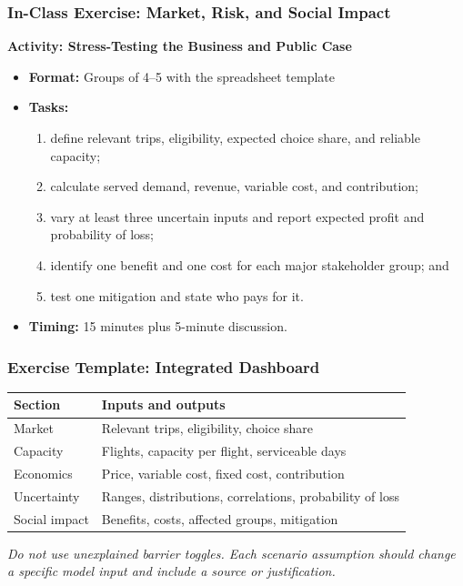 \documentclass{beamer}
\begin{document}
\begin{frame}[t]
\frametitle{In-Class Exercise: Market, Risk, and Social Impact}
\textbf{Activity: Stress-Testing the Business and Public Case}
\begin{itemize}
\item \textbf{Format:} Groups of 4--5 with the spreadsheet template
\item \textbf{Tasks:}
\begin{enumerate}
\item define relevant trips, eligibility, expected choice share, and reliable capacity;
\item calculate served demand, revenue, variable cost, and contribution;
\item vary at least three uncertain inputs and report expected profit and probability of loss;
\item identify one benefit and one cost for each major stakeholder group; and
\item test one mitigation and state who pays for it.
\end{enumerate}
\item \textbf{Timing:} 15 minutes plus 5-minute discussion.
\end{itemize}
\end{frame}

\begin{frame}[t]
\frametitle{Exercise Template: Integrated Dashboard}
\begin{center}\small
\begin{tabular}{l|l}
\textbf{Section} & \textbf{Inputs and outputs}\\
\hline
Market & Relevant trips, eligibility, choice share\\
Capacity & Flights, capacity per flight, serviceable days\\
Economics & Price, variable cost, fixed cost, contribution\\
Uncertainty & Ranges, distributions, correlations, probability of loss\\
Social impact & Benefits, costs, affected groups, mitigation\\
\end{tabular}
\end{center}
\vspace{0.3cm}
\textit{Do not use unexplained barrier toggles. Each scenario assumption should change a specific model input and include a source or justification.}
\end{frame}
\end{document}

